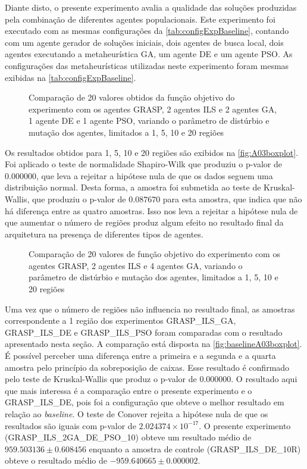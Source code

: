 Diante disto, o presente experimento avalia a qualidade das soluções produzidas pela combinação de diferentes agentes populacionais. Este experimento foi executado com as mesmas configurações da \autoref{tab:configExpBaseline}, contando com um agente gerador de soluções iniciais, dois agentes de busca local, dois agentes executando a metaheurística GA, um agente DE e um agente PSO. As configurações das metaheurísticas utilizadas neste experimento foram mesmas exibidas na \autoref{tab:configExpBaseline}.

\begin{figure}
    \centering
    \caption{Comparação de 20 valores obtidos da função objetivo do experimento com os agentes GRASP, 2 agentes ILS e 2 agentes GA, 1 agente DE e 1 agente PSO, variando o parâmetro de distúrbio e mutação dos agentes, limitados a 1, 5, 10 e 20 regiões}
    
    \label{fig:A03boxplot}
\end{figure}

Os resultados obtidos para 1, 5, 10 e 20 regiões são exibidos na \autoref{fig:A03boxplot}. Foi aplicado o teste de normalidade Shapiro-Wilk que produziu o p-valor de $0.000000$, que leva a rejeitar a hipótese nula de que os dados seguem uma distribuição normal. Desta forma, a amostra foi submetida ao teste de Kruskal-Wallis, que produziu o p-valor de $0.087670$ para esta amostra, que indica que não há diferença entre as quatro amostras. Isso nos leva a rejeitar a hipótese nula de que aumentar o número de regiões produz algum efeito no resultado final da arquitetura na presença de diferentes tipos de agentes. 

\begin{figure}
    \centering
    \caption{Comparação de 20 valores de função objetivo do experimento com os agentes GRASP, 2 agentes ILS e 4 agentes GA, variando o parâmetro de distúrbio e mutação dos agentes, limitados a 1, 5, 10 e 20 regiões}
    
    \label{fig:baselineA03boxplot}
\end{figure}

Uma vez que o número de  regiões não influencia no resultado final, as amostras correspondente a 1 região dos experimentos GRASP\_ILS\_GA, GRASP\_ILS\_DE e GRASP\_ILS\_PSO foram comparadas com o resultado apresentado nesta seção. A comparação está disposta na \autoref{fig:baselineA03boxplot}. É possível perceber uma diferença entre a primeira e a segunda e a quarta amostra pelo princípio da sobreposição de caixas. Esse resultado é confirmado pelo teste de Kruskal-Wallis que produz o p-valor de $0.000000$. O resultado aqui que mais interessa é a comparação entre o presente experimento e o  GRASP\_ILS\_DE, pois foi a configuração que obteve o melhor resultado em relação ao \textit{baseline}. O teste de Conover rejeita a hipótese nula de que os resultados são iguais com p-valor de $2.024374 \times 10^{-17}$. O presente experimento (GRASP\_ILS\_2GA\_DE\_PSO\_10) obteve um resultado médio de $959.503136 \pm 0.608456$ enquanto a amostra de controle (GRASP\_ILS\_DE\_10R) obteve o resultado médio de $-959.640665 \pm 0.000002$. 

